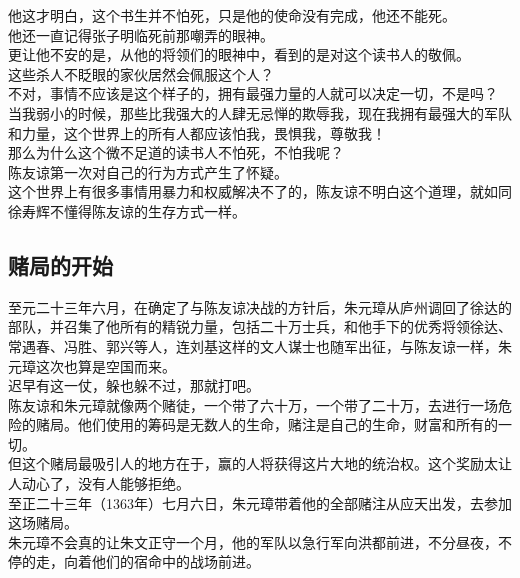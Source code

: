 \begin{multicols}{\theparacolNo}
他这才明白，这个书生并不怕死，只是他的使命没有完成，他还不能死。\\

他还一直记得张子明临死前那嘲弄的眼神。\\

更让他不安的是，从他的将领们的眼神中，看到的是对这个读书人的敬佩。\\

这些杀人不眨眼的家伙居然会佩服这个人？\\

不对，事情不应该是这个样子的，拥有最强力量的人就可以决定一切，不是吗？\\

当我弱小的时候，那些比我强大的人肆无忌惮的欺辱我，现在我拥有最强大的军队和力量，这个世界上的所有人都应该怕我，畏惧我，尊敬我！\\

那么为什么这个微不足道的读书人不怕死，不怕我呢？\\

陈友谅第一次对自己的行为方式产生了怀疑。\\

这个世界上有很多事情用暴力和权威解决不了的，陈友谅不明白这个道理，就如同徐寿辉不懂得陈友谅的生存方式一样。\\

\subsection{赌局的开始}
至元二十三年六月，在确定了与陈友谅决战的方针后，朱元璋从庐州调回了徐达的部队，并召集了他所有的精锐力量，包括二十万士兵，和他手下的优秀将领徐达、常遇春、冯胜、郭兴等人，连刘基这样的文人谋士也随军出征，与陈友谅一样，朱元璋这次也算是空国而来。\\

迟早有这一仗，躲也躲不过，那就打吧。\\

陈友谅和朱元璋就像两个赌徒，一个带了六十万，一个带了二十万，去进行一场危险的赌局。他们使用的筹码是无数人的生命，赌注是自己的生命，财富和所有的一切。\\

但这个赌局最吸引人的地方在于，赢的人将获得这片大地的统治权。这个奖励太让人动心了，没有人能够拒绝。\\

至正二十三年（1363年）七月六日，朱元璋带着他的全部赌注从应天出发，去参加这场赌局。\\

朱元璋不会真的让朱文正守一个月，他的军队以急行军向洪都前进，不分昼夜，不停的走，向着他们的宿命中的战场前进。\\


\end{multicols}
